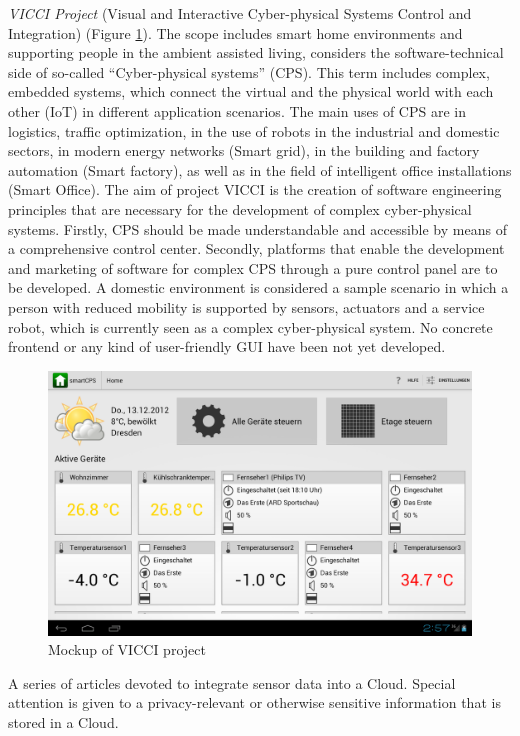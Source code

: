     \emph{VICCI Project} (Visual and Interactive Cyber-physical Systems Control and Integration)\cite{vicci,6548811} (Figure \ref{img:vicci}). The scope includes smart home environments and supporting people in the ambient assisted living, considers the software-technical side of so-called ``Cyber-physical systems'' (CPS). This term includes complex, embedded systems, which connect the virtual and the physical world with each other (IoT) in different application scenarios. The main uses of CPS are in logistics, traffic optimization, in the use of robots in the industrial and domestic sectors, in modern energy networks (Smart grid), in the building and factory automation (Smart factory), as well as in the field of intelligent office installations (Smart Office). The aim of project VICCI is the creation of software engineering principles that are necessary for the development of complex cyber-physical systems. Firstly, CPS should be made understandable and accessible by means of a comprehensive control center. Secondly, platforms that enable the development and marketing of software for complex CPS through a pure control panel are to be developed. A domestic environment is considered a sample scenario in which a person with reduced mobility is supported by sensors, actuators and a service robot, which is currently seen as a complex cyber-physical system. No concrete frontend or any kind of user-friendly GUI have been not yet developed.
     \begin{figure}[!ht]
		\centering
		\includegraphics[scale=0.4]{Material/examples/VICCI.png}   
		\caption[Mockup of VICCI project]{Mockup of VICCI project} 
		\label{img:vicci}                 
		\end{figure} 

	A series of articles devoted to integrate sensor data into a Cloud. Special attention is given to a privacy-relevant or otherwise sensitive information that is stored in a Cloud. 

